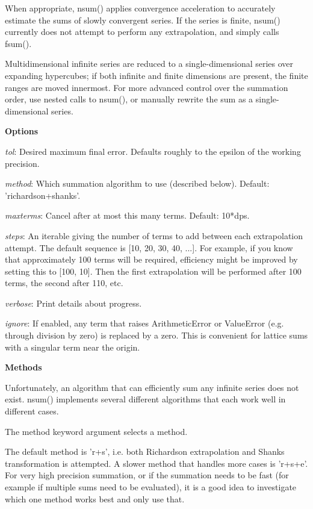 When appropriate, nsum() applies convergence acceleration to accurately estimate the sums of slowly convergent series. If the series is finite, nsum() currently does not attempt to perform any extrapolation, and simply calls fsum().

Multidimensional infinite series are reduced to a single-dimensional series over expanding hypercubes; if both infinite and finite dimensions are present, the finite ranges are moved innermost. For more advanced control over the summation order, use nested calls to nsum(), or manually rewrite the sum as a single-dimensional series.

\vpara
\textbf{Options}

\vpara
\textit{tol}: Desired maximum final error. Defaults roughly to the epsilon of the working precision.

\vpara
\textit{method}: Which summation algorithm to use (described below). Default: 'richardson+shanks'.

\vpara
\textit{maxterms}: Cancel after at most this many terms. Default: 10*dps.

\vpara
\textit{steps}: An iterable giving the number of terms to add between each extrapolation attempt. The default sequence is [10, 20, 30, 40, ...]. For example, if you know that approximately 100 terms will be required, efficiency might be improved by setting this to [100, 10]. Then the first extrapolation will be performed after 100 terms, the second after 110, etc.

\vpara
\textit{verbose}: Print details about progress.

\vpara
\textit{ignore}: If enabled, any term that raises ArithmeticError or ValueError (e.g. through division by zero) is replaced by a zero. This is convenient for lattice sums with a singular term near the origin.

\vpara
\textbf{Methods}

Unfortunately, an algorithm that can efficiently sum any infinite series does not exist. nsum() implements several different algorithms that each work well in different cases.

The method keyword argument selects a method.

\vpara
The default method is 'r+s', i.e. both Richardson extrapolation and Shanks transformation is attempted. A slower method that handles more cases is 'r+s+e'. For very high precision summation, or if the summation needs to be fast (for example if multiple sums need to be evaluated), it is a good idea to investigate which one method works best and only use that.

